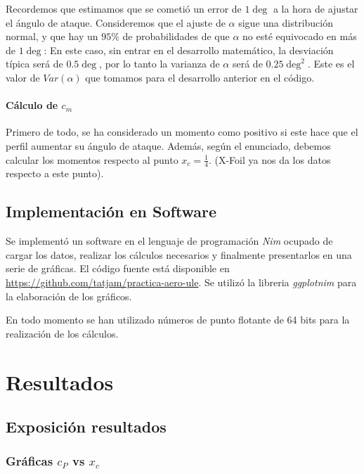 \documentclass{article}
\begin{document}
Recordemos que estimamos que se cometió un error  de $1\deg$ a la hora de ajustar el ángulo de ataque. Consideremos 
que el ajuste de $\alpha$ sigue una distribución normal, y que hay un $95\%$ de probabilidades de que $\alpha$ no esté equivocado
en más de $1\deg$: En este caso, sin entrar en el desarrollo matemático, 
la desviación típica será de $0.5\deg$, por lo tanto la varianza de $\alpha$ será de $0.25\deg^2$. Este es el valor de 
$Var(\alpha)$ que tomamos para el desarrollo anterior en el código.

\paragraph{Cálculo de $c_m$}

Primero de todo, se ha considerado un momento como positivo si este hace que el perfil aumentar su ángulo de ataque.
Además, según el enunciado, debemos calcular los momentos respecto al punto $x_c = \frac{1}{4}$. (X-Foil ya nos da 
los datos respecto a este punto).


\subsection{Implementación en Software}

Se implementó un software en el lenguaje de programación \textit{Nim} ocupado de cargar los datos, realizar los cálculos
necesarios y finalmente presentarlos en una serie de gráficas. El código fuente está disponible en 
\url{https://github.com/tatjam/practica-aero-ule}. Se utilizó la libreria \textit{ggplotnim} para la elaboración
de los gráficos.

En todo momento se han utilizado números de punto flotante de 64 bits para la realización de los cálculos.

\newpage
\section{Resultados}

\subsection{Exposición resultados}

\subsubsection{Gráficas \texorpdfstring{$c_P$}{presión} vs \texorpdfstring{$x_c$}{posición}}
\end{document}
